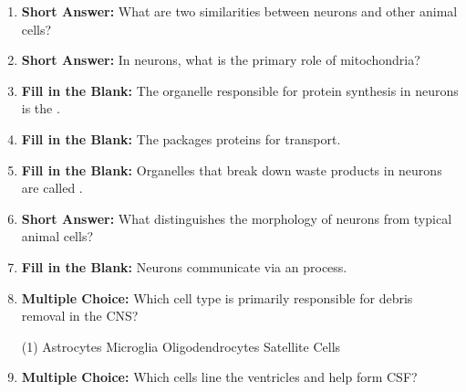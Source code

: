\begin{enumerate}[label=\textbf{Q2.1.\arabic*}]
      \item \textbf{Short Answer:} What are two similarities between neurons and other animal cells? \\
      \item \textbf{Short Answer:} In neurons, what is the primary role of mitochondria? \\
      \item \textbf{Fill in the Blank:} The organelle responsible for protein synthesis in neurons is the \underline{\hspace{3cm}}. \\
      \item \textbf{Fill in the Blank:} The \underline{\hspace{3cm}} packages proteins for transport. \\
      \item \textbf{Fill in the Blank:} Organelles that break down waste products in neurons are called \underline{\hspace{3cm}}. \\
      \item \textbf{Short Answer:} What distinguishes the morphology of neurons from typical animal cells? \\
      \item \textbf{Fill in the Blank:} Neurons communicate via an \underline{\hspace{3cm}} process. \\
      \item \textbf{Multiple Choice:} Which cell type is primarily responsible for debris removal in the CNS?
            \begin{tasks}[label=(\Alph*), label-width=1.5em, item-indent=1.7em](1)
                  \task Astrocytes
                  \task Microglia
                  \task Oligodendrocytes
                  \task Satellite Cells
            \end{tasks}
      \item \textbf{Multiple Choice:} Which cells line the ventricles and help form CSF?

\end{enumerate}
